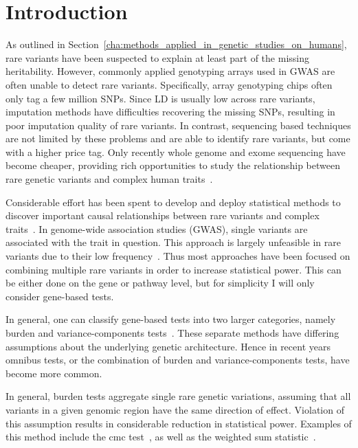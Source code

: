 \section{Introduction}
\label{sec:introduction_ksburden}

As outlined in Section~\ref{cha:methods_applied_in_genetic_studies_on_humans}, rare variants have been suspected to explain at least part of the missing heritability.
However, commonly applied genotyping arrays used in GWAS are often unable to detect rare variants.
Specifically, array genotyping chips often only tag a few million SNPs.
Since LD is usually low across rare variants, imputation methods have difficulties recovering the missing SNPs, resulting in poor imputation quality of rare variants.
In contrast, sequencing based techniques are not limited by these problems and are able to identify rare variants, but come with a higher price tag.
Only recently whole genome and exome sequencing have become cheaper, providing rich opportunities to study the relationship between rare genetic variants and complex human traits~\cite{Goodwin2016}.

Considerable effort has been spent to develop and deploy statistical methods to discover important causal relationships between rare variants and complex traits~\cite{Morris2010,Zeng2014,Daye2012,Manuscript2013}.
In genome-wide association studies (GWAS), single variants are associated with the trait in question.
This approach is largely unfeasible in rare variants due to their low frequency~\cite{Lee2014}.
Thus most approaches have been focused on combining multiple rare variants in order to increase statistical power.
This can be either done on the gene or pathway level, but for simplicity I will only consider gene-based tests.

In general, one can classify gene-based tests into two larger categories, namely burden and variance-components tests~\cite{Lee2014}.
These separate methods have differing assumptions about the underlying genetic architecture.
Hence in recent years omnibus tests, or the combination of burden and variance-components tests, have become more common.

In general, burden tests aggregate single rare genetic variations, assuming that all variants in a given genomic region have the same direction of effect.
Violation of this assumption results in considerable reduction in statistical power.
Examples of this method include the \acrfull{cmc} test~\cite{Li2008}, as well as the weighted sum statistic~\cite{Madsen2009}.


